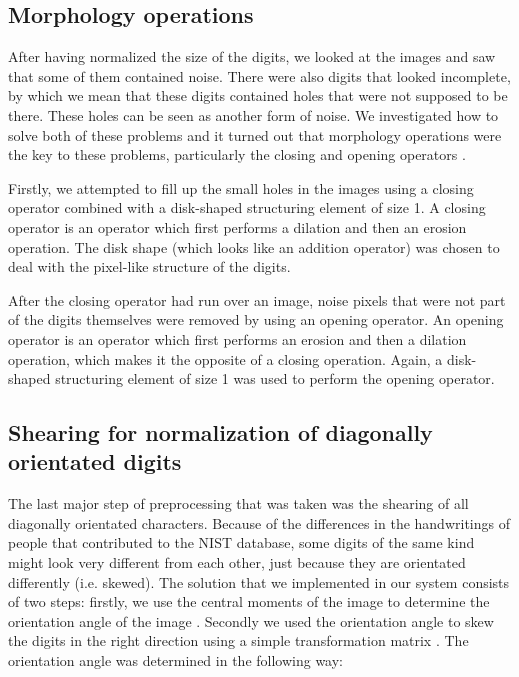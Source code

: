 \documentclass[11pt,twoside,a4paper]{article}
\begin{document}
\subsection{Morphology operations} %
After having normalized the size of the digits, we looked at the images and saw that some of them contained noise. There were also digits that looked incomplete, by which we mean that these digits contained holes that were not supposed to be there. These holes can be seen as another form of noise. We investigated how to solve both of these problems and it turned out that morphology operations were the key to these problems, particularly the closing and opening operators \cite{bishnoi2014, jamil2008noise}.

Firstly, we attempted to fill up the small holes in the images using a closing operator combined with a disk-shaped structuring element of size 1. A closing operator is an operator which first performs a dilation and then an erosion operation. The disk shape (which looks like an addition operator) was chosen to deal with the pixel-like structure of the digits.

After the closing operator had run over an image, noise pixels that were not part of the digits themselves were removed by using an opening operator. An opening operator is an operator which first performs an erosion and then a dilation operation, which makes it the opposite of a closing operation. Again, a disk-shaped structuring element of size 1 was used to perform the opening operator.

\subsection{Shearing for normalization of diagonally orientated digits}
The last major step of preprocessing that was taken was the shearing of all diagonally orientated characters. Because of the differences in the handwritings of people that contributed to the NIST database, some digits of the same kind might look very different from each other, just because they are orientated differently (i.e. skewed). The solution that we implemented in our system consists of two steps: firstly, we use the central moments of the image to determine the orientation angle of the image \cite{gonzalez2002digital}. Secondly we used the orientation angle to skew the digits in the right direction using a simple transformation matrix \cite{yamaguchi2003digit}. The orientation angle was determined in the following way:
\end{document}
